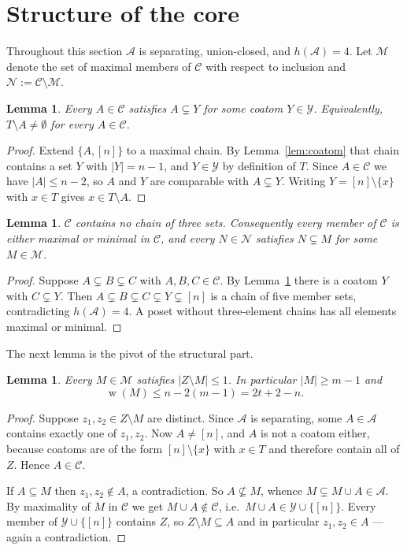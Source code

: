 \documentclass[11pt,a4paper]{amsart}
\theoremstyle{plain}
\newtheorem{lemma}[theorem]{Lemma}
\theoremstyle{definition}
\newcommand{\A}{\mathcal{A}}
\newcommand{\Cc}{\mathcal{C}}
\newcommand{\Mm}{\mathcal{M}}
\newcommand{\Nn}{\mathcal{N}}
\newcommand{\Yy}{\mathcal{Y}}
\DeclareMathOperator{\wt}{w}
\begin{document}
\section{Structure of the core}\label{sec:struct}

Throughout this section $\A$ is separating, union-closed, and $h(\A)=4$. Let
$\Mm$ denote the set of maximal members of $\Cc$ with respect to inclusion and
$\Nn:=\Cc\setminus\Mm$.

\begin{lemma}\label{lem:under}
Every $A\in\Cc$ satisfies $A\subsetneq Y$ for some coatom $Y\in\Yy$. Equivalently,
$T\setminus A\neq\emptyset$ for every $A\in\Cc$.
\end{lemma}

\begin{proof}
Extend $\{A,[n]\}$ to a maximal chain. By Lemma~\ref{lem:coatom} that chain
contains a set $Y$ with $|Y|=n-1$, and $Y\in\Yy$ by definition of $T$. Since
$A\in\Cc$ we have $|A|\le n-2$, so $A$ and $Y$ are comparable with
$A\subsetneq Y$. Writing $Y=[n]\setminus\{x\}$ with $x\in T$ gives
$x\in T\setminus A$.
\end{proof}

\begin{lemma}\label{lem:nochain}
$\Cc$ contains no chain of three sets. Consequently every member of $\Cc$ is
either maximal or minimal in $\Cc$, and every $N\in\Nn$ satisfies
$N\subsetneq M$ for some $M\in\Mm$.
\end{lemma}

\begin{proof}
Suppose $A\subsetneq B\subsetneq C$ with $A,B,C\in\Cc$. By Lemma~\ref{lem:under}
there is a coatom $Y$ with $C\subsetneq Y$. Then
$A\subsetneq B\subsetneq C\subsetneq Y\subsetneq[n]$ is a chain of five member
sets, contradicting $h(\A)=4$. A poset without three-element chains has all
elements maximal or minimal.
\end{proof}

The next lemma is the pivot of the structural part.

\begin{lemma}\label{lem:Zminus}
Every $M\in\Mm$ satisfies $|Z\setminus M|\le1$. In particular $|M|\ge m-1$ and
\[
  \wt(M)\le n-2(m-1)=2t+2-n.
\]
\end{lemma}

\begin{proof}
Suppose $z_1,z_2\in Z\setminus M$ are distinct. Since $\A$ is separating, some
$A\in\A$ contains exactly one of $z_1,z_2$. Now $A\neq[n]$, and $A$ is not a
coatom either, because coatoms are of the form $[n]\setminus\{x\}$ with $x\in T$
and therefore contain all of $Z$. Hence $A\in\Cc$.

If $A\subseteq M$ then $z_1,z_2\notin A$, a contradiction. So
$A\not\subseteq M$, whence $M\subsetneq M\cup A\in\A$. By maximality of $M$ in
$\Cc$ we get $M\cup A\notin\Cc$, i.e.\ $M\cup A\in\Yy\cup\{[n]\}$. Every member
of $\Yy\cup\{[n]\}$ contains $Z$, so $Z\setminus M\subseteq A$ and in particular
$z_1,z_2\in A$ --- again a contradiction.
\end{proof}
\end{document}
